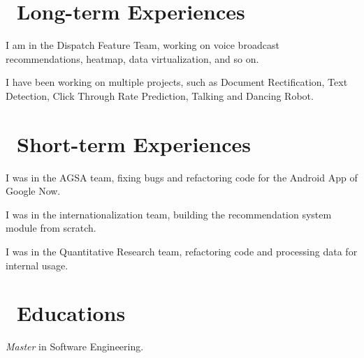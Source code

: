 \documentclass{resume}
\begin{document}



\section{\faUsers\ Long-term Experiences}
I am in the Dispatch Feature Team, 
working on voice broadcast recommendations, heatmap, data virtualization, and so on.

I have been working on multiple projects, 
such as Document Rectification, Text Detection, Click Through Rate Prediction, Talking and Dancing Robot.

\section{\faUser\ Short-term Experiences}

I was in the AGSA team, fixing bugs and refactoring code for the Android App of Google Now.

I was in the internationalization team, building the recommendation system module from scratch. 

I was in the Quantitative Research team, refactoring code and processing data for internal usage.

\section{\faGraduationCap\ Educations}
\textit{Master} in Software Engineering.
\end{document}
